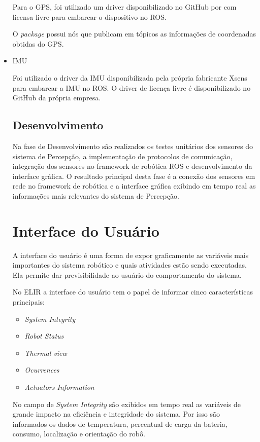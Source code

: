 \begin{itemize}
Para o GPS, foi utilizado um driver disponibilizado no GitHub por  com licensa livre para embarcar o dispositivo no ROS.

O \textit{package} possui nós que publicam em tópicos as informações de coordenadas obtidas do GPS.

\item IMU

Foi utilizado o driver da IMU disponibilizada pela própria fabricante Xsens para embarcar a IMU no ROS. O driver de licença livre é disponibilizado no GitHub da própria empresa.

\subsection{Desenvolvimento}
Na fase de Desenvolvimento são realizados os testes unitários dos sensores do sistema de Percepção, a implementação de protocolos de comunicação, integração dos sensores no framework de robótica ROS e desenvolvimento da interface gráfica. O resultado principal desta fase é a conexão dos sensores em rede no framework de robótica e a interface gráfica exibindo em tempo real as informações mais relevantes do sistema de Percepção.

\section{Interface do Usuário}
\label{sec:ui}

A interface do usuário é uma forma de expor graficamente as variáveis mais importantes do sistema robótico e quais atividades estão sendo executadas. Ela permite dar previsibilidade ao usuário do comportamento do sistema. 

No ELIR a interface do usuário tem o papel de informar cinco características principais:

\begin{itemize}
	\item \textit{System Integrity}
	\item \textit{Robot Status}
	\item \textit{Thermal view}
	\item \textit{Ocurrences}
	\item \textit{Actuators Information}
\end{itemize}

No campo de \textit{System Integrity} são exibidos em tempo real as variáveis de grande impacto na eficiência e integridade do sistema. Por isso são informados os dados de temperatura, percentual de carga da bateria, consumo, localização e orientação do robô.


\end{itemize}
